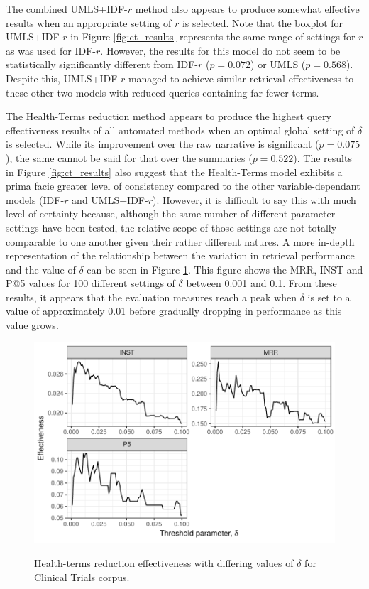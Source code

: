 \documentclass[a4paper]{report}
\begin{document}
The combined UMLS+IDF-$r$ method also appears to produce somewhat effective results when an appropriate setting of $r$ is selected. Note that the boxplot for UMLS+IDF-$r$ in Figure \ref{fig:ct_results} represents the same range of settings for $r$ as was used for IDF-$r$. However, the results for this model do not seem to be statistically significantly different from IDF-$r$ ($p = 0.072$) or UMLS ($p = 0.568$). Despite this, UMLS+IDF-$r$ managed to achieve similar retrieval effectiveness to these other two models with reduced queries containing far fewer terms.

The Health-Terms reduction method appears to produce the highest query effectiveness results of all automated methods when an optimal global setting of $\delta$ is selected. While its improvement over the raw narrative is significant ($p=0.075$), the same cannot be said for that over the summaries ($p=0.522$). The results in Figure \ref{fig:ct_results} also suggest that the Health-Terms model exhibits a prima facie greater level of consistency compared to the other variable-dependant models (IDF-$r$ and UMLS+IDF-$r$). However, it is difficult to say this with much level of certainty because, although the same number of different parameter settings have been tested, the relative scope of those settings are not totally comparable to one another given their rather different natures. A more in-depth representation of the relationship between the variation in retrieval performance and the value of $\delta$ can be seen in Figure \ref{fig:ctht_results}. This figure shows the MRR, INST and P@5 values for 100 different settings of $\delta$ between 0.001 and 0.1. From these results, it appears that the evaluation measures reach a peak when $\delta$ is set to a value of approximately 0.01 before gradually dropping in performance as this value grows.

\begin{figure}
\centering
\caption{Health-terms reduction effectiveness with differing values of $\delta$ for Clinical Trials corpus.}
\includegraphics[width=.9\columnwidth]{cthtmodel.pdf}
\label{fig:ctht_results}
\end{figure}
\end{document}
